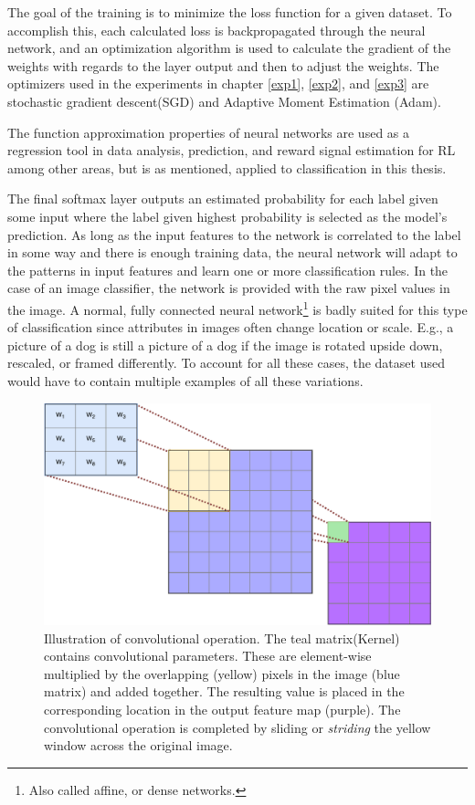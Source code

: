 The goal of the training is to minimize the loss function for a given dataset. To accomplish this, each calculated loss is backpropagated through the neural network, and an optimization algorithm is used to calculate the gradient of the weights with regards to the layer output and then to adjust the weights. The optimizers used in the experiments in chapter \ref{exp1}, \ref{exp2}, and \ref{exp3} are stochastic gradient descent(SGD)\cite{sgd} and Adaptive Moment Estimation (Adam)\cite{adam}. 

The function approximation properties of neural networks are used as a regression tool in data analysis, prediction, and reward signal estimation for RL among other areas, but is as mentioned, applied to classification in this thesis.

The final softmax layer outputs an estimated probability for each label given some input where the label given highest probability is selected as the model's prediction. As long as the input features to the network is correlated to the label in some way and there is enough training data, the neural network will adapt to the patterns in input features and learn one or more classification rules. In the case of an image classifier, the network is provided with the raw pixel values in the image. A normal, fully connected neural network\footnote{Also called affine, or dense networks.} is badly suited for this type of classification since attributes in images often change location or scale. E.g., a picture of a dog is still a picture of a dog if the image is rotated upside down, rescaled, or framed differently. To account for all these cases, the dataset used would have to contain multiple examples of all these variations.
\begin{figure}[ht] 
    \centering
    \includegraphics[width=\linewidth]{Chapters/2.Background/figures/convolution.pdf}
    \caption[Illustration of convolutional operation.]{Illustration of convolutional operation. The teal matrix(Kernel) contains convolutional parameters. These are element-wise multiplied by the overlapping (yellow) pixels in the image (blue matrix) and added together. The resulting value is placed in the corresponding location in the output feature map (purple). The convolutional operation is completed by sliding or \textit{striding} the yellow window across the original image.}
    \label{fig:conv}
\end{figure}
